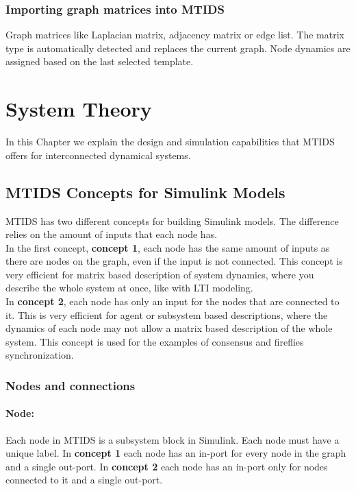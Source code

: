 \documentclass[a4paper,twoside, openright,12pt]{report}
\begin{document}
\subsection{Importing graph matrices into MTIDS}
Graph matrices like Laplacian matrix, adjacency matrix or edge list. The matrix type is automatically detected and replaces the current graph. Node dynamics are assigned based on the last selected template.


\chapter{System Theory}\label{chapter3}

In this Chapter we explain the design and simulation capabilities that MTIDS offers for interconnected dynamical systems.

\section{MTIDS Concepts for Simulink Models} \label{subsystemConcept}
MTIDS has two different concepts for building Simulink models. The difference relies on the amount of inputs that each node has.
\\

In the first concept, \textbf{concept 1}, each node has the same amount of inputs as there are nodes on the graph, even if the input is not connected. This concept is very efficient 
for matrix based description of system dynamics, where you describe the whole system at once,  like with LTI modeling.  \\

In \textbf{concept 2}, each node has only an input for the nodes that are connected to it. This is very efficient for agent or subsystem based descriptions, 
where the dynamics of each node may not allow a matrix based description of the  whole system. This concept is used for the examples of 
consensus and fireflies synchronization.     

\subsection{Nodes and connections}
\subsubsection{Node:}
Each node in MTIDS is a subsystem block in Simulink. Each node must have a unique label.
In \textbf{concept 1} each node has an in-port for every node in the graph and a single out-port. In \textbf{concept 2} each node has an in-port only 
for nodes connected to it and a single out-port.
\end{document}

